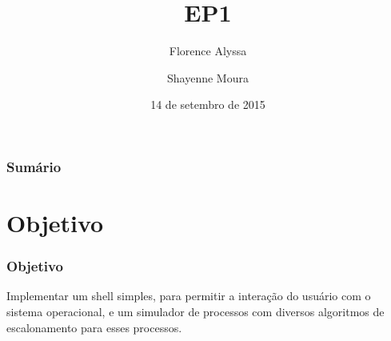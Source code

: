 \documentclass{beamer}
\title{EP1} %
\author{Florence Alyssa \and Shayenne Moura} %
\institute[USP] %
{
Sistemas Operacionais
 \\ Bacharelado em Ciência da Computação%
\medskip
\textit{} %
}
\date{14 de setembro de 2015} %
\begin{document}
\begin{frame}
\titlepage %
\end{frame}

\begin{frame}
\frametitle{Sumário}
\tableofcontents
\end{frame}




\section{Objetivo} 

\begin{frame}
\frametitle{Objetivo}
Implementar um shell simples, para permitir a interação do usuário com o sistema operacional, e um simulador de processos com diversos algoritmos de escalonamento para esses
processos. 
\end{frame}
\end{document}
